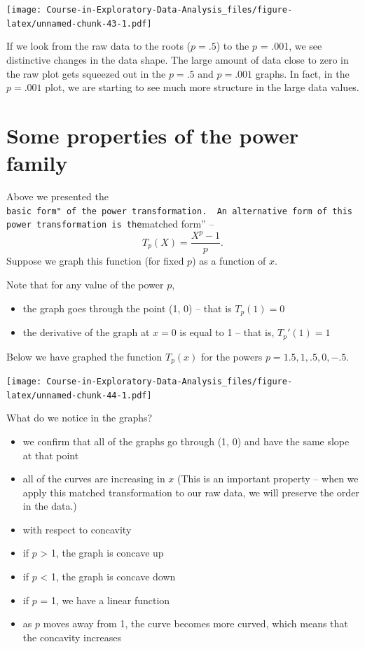 \documentclass[
]{book}
\providecommand{\tightlist}{%
  \setlength{\itemsep}{0pt}\setlength{\parskip}{0pt}}
\begin{document}
\texttt{[image: Course-in-Exploratory-Data-Analysis\_files/figure-latex/unnamed-chunk-43-1.pdf]}

If we look from the raw data to the roots (\(p = .5\)) to the \(p\) = .001, we see distinctive changes in the data shape. The large amount of data close to zero in the raw plot gets squeezed out in the \(p = .5\) and \(p = .001\) graphs. In fact, in the \(p = .001\) plot, we are starting to see much more structure in the large data values.

\hypertarget{some-properties-of-the-power-family}{%
\section{Some properties of the power family}\label{some-properties-of-the-power-family}}

Above we presented the \texttt{basic\ form"\ of\ the\ power\ transformation.\ \ An\ alternative\ form\ of\ this\ power\ transformation\ is\ the}matched form'' --
\[
T_p(X) = \frac{X^p - 1}{p}.
\]
Suppose we graph this function (for fixed \(p\)) as a function of \(x\).

Note that for any value of the power \(p\),

\begin{itemize}
\tightlist
\item
  the graph goes through the point (1, 0) -- that is \(T_p(1) = 0\)
\item
  the derivative of the graph at \(x = 0\) is equal to 1 -- that is, \(T_p'(1) = 1\)
\end{itemize}

Below we have graphed the function \(T_p(x)\) for the powers \(p = 1.5, 1, .5, 0, -.5\).

\texttt{[image: Course-in-Exploratory-Data-Analysis\_files/figure-latex/unnamed-chunk-44-1.pdf]}

What do we notice in the graphs?

\begin{itemize}
\item
  we confirm that all of the graphs go through (1, 0) and have the same slope at that point
\item
  all of the curves are increasing in \(x\)
  (This is an important property -- when we apply this matched transformation to our raw data, we will preserve the order in the data.)
\item
  with respect to concavity
\item
  if \(p\) \textgreater{} 1, the graph is concave up
\item
  if \(p\) \textless{} 1, the graph is concave down
\item
  if \(p\) = 1, we have a linear function
\item
  as \(p\) moves away from 1, the curve becomes more curved, which means that the concavity increases
\end{itemize}
\end{document}

